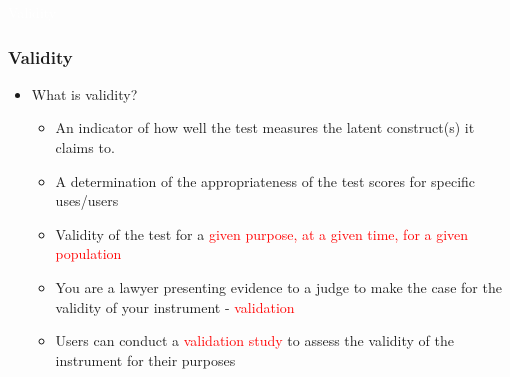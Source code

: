 \documentclass[dvipsnames]{beamer}\usepackage[]{graphicx}\usepackage[]{color}
\begin{document}
{
\begin{frame}
\centering\Huge \textcolor{white}{Validity}
\end{frame}
}

\frame
{
  \frametitle{Validity}

  \begin{itemize}
  	\item What is validity?
		\begin{itemize}
			\item An indicator of how well the test measures the latent construct(s) it claims to.
			\item A determination of the appropriateness of the test scores for specific uses/users 	
			\item Validity of the test for a \textcolor{red}{given purpose, at a given time, for a given population}
			\item You are a lawyer presenting evidence to a judge to make the case for the validity of your instrument - \textcolor{red}{validation}
			\item Users can conduct a \textcolor{red}{validation study} to assess the validity of the instrument for their purposes
		\end{itemize}  
  \end{itemize}
}

\end{document}
